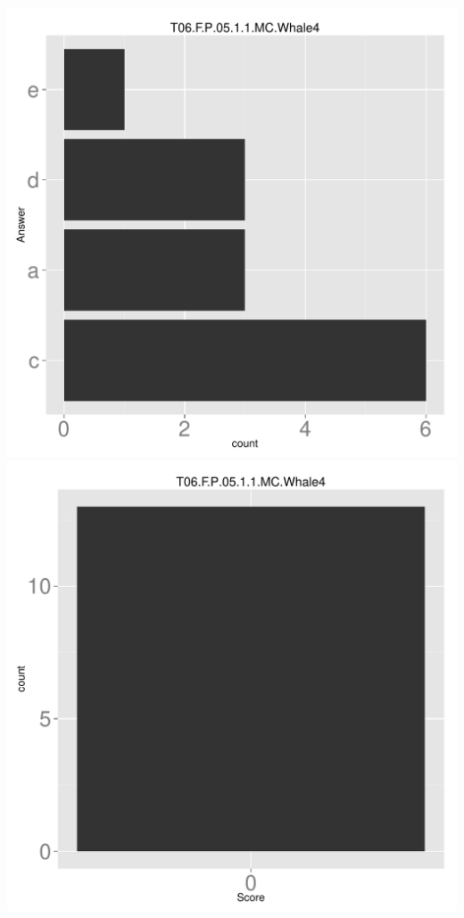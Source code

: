 \documentclass[12pt,english,nohyper]{tufte-handout}\usepackage[]{graphicx}\usepackage[]{color}
\begin{document}
\begin{center} \includegraphics[width=.45\linewidth]{Topic06_AB_63_answer} \includegraphics[width=.45\linewidth]{Topic06_AB_63_score} \end{center} 
\end{document}
